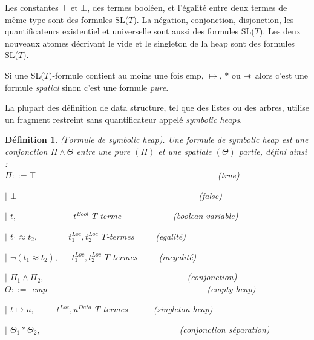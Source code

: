 \documentclass[9pt]{book}
\newcommand\sepimp{\mathrel{-\mkern-6mu*}}
\newtheorem{definition}{D\'efinition}[section]
\begin{document}
	Les constantes $\top$ et $\bot$, des termes bool\'een, et l'\'egalit\'e entre deux termes de m\^eme type sont des formules SL($T$). La n\'egation, conjonction, disjonction, les quantificateurs existentiel et universelle sont aussi des formules SL($T$).
	Les deux nouveaux atomes d\'ecrivant le vide et le singleton de la heap sont des formules SL($T$).\par
	Si une SL($T$)-formule contient au moins une fois emp, $\mapsto$, $*$ ou $\sepimp$ alors c'est une formule \textit{spatial} sinon c'est une formule \textit{pure}.\par
	La plupart des d\'efinition de data structure, tel que des listes ou des arbres, utilise un fragment restreint sans quantificateur appel\'e \textit{symbolic heaps}.
\begin{definition}
(Formule de symbolic heap). Une formule de \textit{symbolic heap} est une conjonction $\Pi\land\Theta$ entre une pure $(\Pi)$ et une spatiale $(\Theta)$ partie, d\'efini ainsi :\\
$\Pi ::= \top$~~~~~~~~~~~~~~~~~~~~~~~~~~~~~~~~~~~~~~~~~~(true)\par
$|$ $\bot$~~~~~~~~~~~~~~~~~~~~~~~~~~~~~~~~~~~~~~~~~~(false)\par
$|$ $t,$~~~~~~~~~~~~~$t^{Bool}$ $T$-terme~~~~~~~~~~~~(boolean variable)\par
$|$ $t_{1}\approx t_{2},$~~~~~~~$t^{Loc}_{1},t^{Loc}_{2}$ $T$-termes~~~~~(egalit\'e)\par
$|$ $\neg(t_{1}\approx t_{2}),$~~~$t^{Loc}_{1},t^{Loc}_{2}$ $T$-termes~~~~~(inegalit\'e)\par
$|$ $\Pi_{1}\land\Pi_{2},$~~~~~~~~~~~~~~~~~~~~~~~~~~~~~~~~~(conjonction)\\
$\Theta ::=$ emp~~~~~~~~~~~~~~~~~~~~~~~~~~~~~~~~~~~~~(empty heap)\par
$|$ $t\mapsto u,$~~~~~$t^{Loc},u^{Data}$ $T$-termes~~~~~~(singleton heap)\par
$|$ $\Theta_{1}*\Theta_{2},$~~~~~~~~~~~~~~~~~~~~~~~~~~~~~~~~(conjonction s\'eparation)
\end{definition}
\end{document}
